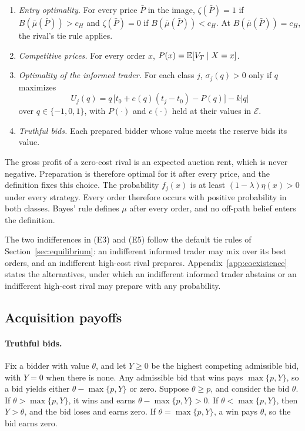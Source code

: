 \begin{definition}[Equilibrium]
\begin{enumerate}[label=(E\arabic*),leftmargin=3em]
posterior of class \(H\) given the event \(\{x:P(x)=\bar P\}\), computed from \(f_H\) and \(f_L\).
\item \emph{Entry optimality.} For every price \(\bar P\) in the image, \(\zeta(\bar P)=1\) if
\(B(\bar\mu(\bar P))>c_H\) and \(\zeta(\bar P)=0\) if \(B(\bar\mu(\bar P))<c_H\). At
\(B(\bar\mu(\bar P))=c_H\), the rival's tie rule applies.
\item \emph{Competitive prices.} For every order \(x\), \(P(x)=\mathbb{E}[V_T\mid X=x]\).
\item \emph{Optimality of the informed trader.} For each class \(j\), \(\sigma_j(q)>0\) only if \(q\) maximizes
\[
U_j(q)=q\,\bigl[t_0+e(q)(t_j-t_0)-P(q)\bigr]-k|q|
\]
over \(q\in\{-1,0,1\}\), with \(P(\cdot)\) and \(e(\cdot)\) held at their values in \(\mathcal{E}\).
\item \emph{Truthful bids.} Each prepared bidder whose value meets the reserve bids its value.
\end{enumerate}
\end{definition}

The gross profit of a zero-cost rival is an expected auction rent, which is never negative. Preparation is
therefore optimal for it after every price, and the definition fixes this choice. The probability \(f_j(x)\) is
at least \((1-\lambda)\eta(x)>0\) under every strategy. Every order therefore occurs with positive probability in
both classes. Bayes' rule defines \(\mu\) after every order, and no off-path belief enters the definition.

The two indifferences in (E3) and (E5) follow the default tie rules of Section~\ref{sec:equilibrium}: an
indifferent informed trader may mix over its best orders, and an indifferent high-cost rival prepares.
Appendix~\ref{app:coexistence} states the alternatives, under which an indifferent informed trader abstains or an indifferent
high-cost rival may prepare with any probability.

\subsection{Acquisition payoffs}\label{app:payoffs}

\paragraph{Truthful bids.}
Fix a bidder with value \(\theta\), and let \(Y\ge0\) be the highest competing admissible bid, with \(Y=0\) when
there is none. Any admissible bid that wins pays \(\max\{p,Y\}\), so a bid yields either \(\theta-\max\{p,Y\}\) or
zero. Suppose \(\theta\ge p\), and consider the bid \(\theta\). If \(\theta>\max\{p,Y\}\), it wins and earns
\(\theta-\max\{p,Y\}>0\). If \(\theta<\max\{p,Y\}\), then \(Y>\theta\), and the bid loses and earns zero. If
\(\theta=\max\{p,Y\}\), a win pays \(\theta\), so the bid earns zero.

